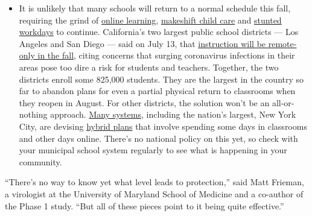 \begin{itemize}
  \begin{itemize}
  \tightlist
  \item
    It is unlikely that many schools will return to a normal schedule
    this fall, requiring the grind of
    \href{https://www.nytimes.com/2020/06/05/us/coronavirus-education-lost-learning.html?action=click\&pgtype=Article\&state=default\&region=MAIN_CONTENT_3\&context=storylines_faq}{online
    learning},
    \href{https://www.nytimes.com/2020/05/29/us/coronavirus-child-care-centers.html?action=click\&pgtype=Article\&state=default\&region=MAIN_CONTENT_3\&context=storylines_faq}{makeshift
    child care} and
    \href{https://www.nytimes.com/2020/06/03/business/economy/coronavirus-working-women.html?action=click\&pgtype=Article\&state=default\&region=MAIN_CONTENT_3\&context=storylines_faq}{stunted
    workdays} to continue. California's two largest public school
    districts --- Los Angeles and San Diego --- said on July 13, that
    \href{https://www.nytimes.com/2020/07/13/us/lausd-san-diego-school-reopening.html?action=click\&pgtype=Article\&state=default\&region=MAIN_CONTENT_3\&context=storylines_faq}{instruction
    will be remote-only in the fall}, citing concerns that surging
    coronavirus infections in their areas pose too dire a risk for
    students and teachers. Together, the two districts enroll some
    825,000 students. They are the largest in the country so far to
    abandon plans for even a partial physical return to classrooms when
    they reopen in August. For other districts, the solution won't be an
    all-or-nothing approach.
    \href{https://bioethics.jhu.edu/research-and-outreach/projects/eschool-initiative/school-policy-tracker/}{Many
    systems}, including the nation's largest, New York City, are
    devising
    \href{https://www.nytimes.com/2020/06/26/us/coronavirus-schools-reopen-fall.html?action=click\&pgtype=Article\&state=default\&region=MAIN_CONTENT_3\&context=storylines_faq}{hybrid
    plans} that involve spending some days in classrooms and other days
    online. There's no national policy on this yet, so check with your
    municipal school system regularly to see what is happening in your
    community.
  \end{itemize}
\end{itemize}

``There's no way to know yet what level leads to protection,'' said Matt
Frieman, a virologist at the University of Maryland School of Medicine
and a co-author of the Phase 1 study. ``But all of these pieces point to
it being quite effective.''

